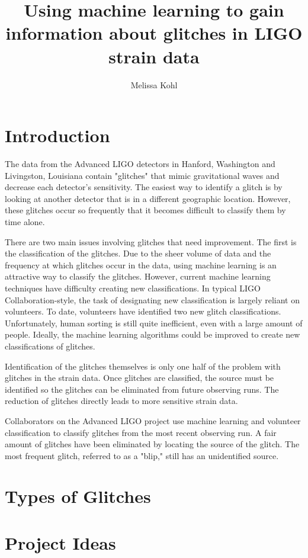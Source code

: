 \documentclass[a4paper]{article}
\title{Using machine learning to gain information about glitches in LIGO strain data}
\author{Melissa Kohl}
\begin{document}
\maketitle

\section{Introduction}

The data from the Advanced LIGO detectors in Hanford, Washington and Livingston, Louisiana contain "glitches" that mimic gravitational waves and decrease each detector's sensitivity. The easiest way to identify a glitch is by looking at another detector that is in a different geographic location. However, these glitches occur so frequently that it becomes difficult to classify them by time alone. 

There are two main issues involving glitches that need improvement. The first is the classification of the glitches. Due to the sheer volume of data and the frequency at which glitches occur in the data, using machine learning is an attractive way to classify the glitches. However, current machine learning techniques have difficulty creating new classifications. In typical LIGO Collaboration-style, the task of designating new classification is largely reliant on volunteers. To date, volunteers have identified two new glitch classifications. Unfortunately, human sorting is still quite inefficient, even with a large amount of people. Ideally, the machine learning algorithms could be improved to create new classifications of glitches. 

Identification of the glitches themselves is only one half of the problem with glitches in the strain data. Once glitches are classified, the source must be identified so the glitches can be eliminated from future observing runs. The reduction of glitches directly leads to more sensitive strain data.

Collaborators on the Advanced LIGO project use machine learning and volunteer classification to classify glitches from the most recent observing run. A fair amount of glitches have been eliminated by locating the source of the glitch. The most frequent glitch, referred to as a "blip," still has an unidentified source.

\section{Types of Glitches}

\section{Project Ideas}
\end{document}
